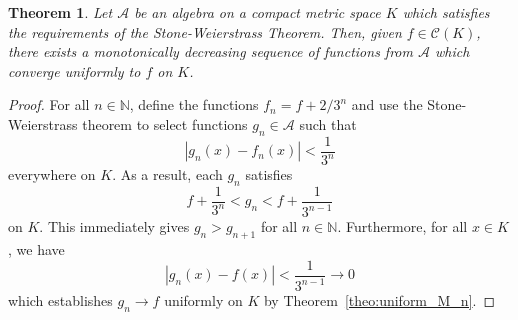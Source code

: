 \documentclass[11pt]{article}
\def\N{\mathbb{N}}
\newtheorem{theorem}{Theorem}[section]
\theoremstyle{definition}
\theoremstyle{remark}
\begin{document}
    \begin{theorem}
        Let $\mathscr{A}$ be an algebra on a compact metric space $K$ which satisfies
        the requirements of the Stone-Weierstrass Theorem. Then, given $f \in
        \mathscr{C}(K)$, there exists a monotonically decreasing sequence of
        functions from $\mathscr{A}$ which converge uniformly to $f$ on $K$.
    \end{theorem}
    \begin{proof}
        For all $n \in \N$, define the functions $f_n = f + 2 /3^{n}$ and use the
        Stone-Weierstrass theorem to select functions $g_n \in \mathscr{A}$ such that
        \[
            |g_n(x) - f_n(x)| < \frac{1}{3^n}
        \] everywhere on $K$. As a result, each $g_n$ satisfies \[
            f + \frac{1}{3^{n}} < g_n < f + \frac{1}{3^{n - 1}}
        \] on $K$. This immediately gives $g_n > g_{n + 1}$ for all $n \in \N$.
        Furthermore, for all $x \in K$, we have \[
            |g_n(x) - f(x)| < \frac{1}{3^{n - 1}} \to 0
        \] which establishes $g_n \to f$ uniformly on $K$ by
        Theorem~\ref{theo:uniform_M_n}.
    \end{proof}
\end{document}
